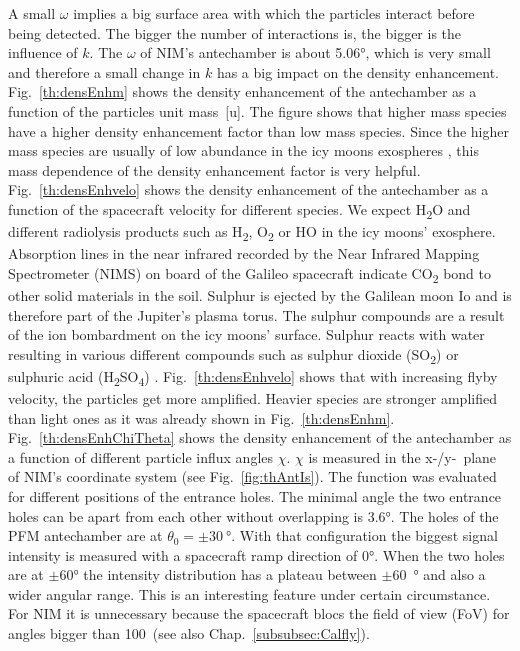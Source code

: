 	A small $\omega$ implies a big surface area with which the particles interact before being detected. The bigger the number of interactions is, the bigger is the influence of $k$. The $\omega$ of NIM's antechamber is about 5.06°, which is very small and therefore a small change in $k$ has a big impact on the density enhancement.\\
	Fig.~\ref{th:densEnhm} shows the density enhancement of the antechamber as a function of the particles unit mass~[u]. The figure shows that higher mass species have a higher density enhancement factor than low mass species. Since the higher mass species are usually of low abundance in the icy moons exospheres \cite{Vorburger2015,Vorburger_2018}, this mass dependence of the density enhancement factor is very helpful.\\
	Fig.~\ref{th:densEnhvelo} shows the density enhancement of the antechamber as a function of the spacecraft velocity for different species. We expect H\textsubscript{2}O and different radiolysis products such as H\textsubscript{2}, O\textsubscript{2} or HO in the icy moons' exosphere. Absorption lines in the near infrared recorded by the Near Infrared Mapping Spectrometer (NIMS) on board of the Galileo spacecraft indicate CO\textsubscript{2} bond to other solid materials in the soil. Sulphur is ejected by the Galilean moon Io and is therefore part of the Jupiter's plasma torus. The sulphur compounds are a result of the ion bombardment on the icy moons' surface. Sulphur reacts with water resulting in various different compounds such as sulphur dioxide (SO\textsubscript{2}) or sulphuric acid (H\textsubscript{2}SO\textsubscript{4}) \cite{Collins_2014}. Fig.~\ref{th:densEnhvelo} shows that with increasing flyby velocity, the particles get more amplified. Heavier species are stronger amplified than light ones as it was already shown in Fig.~\ref{th:densEnhm}.\\
	Fig.~\ref{th:densEnhChiTheta} shows the density enhancement of the antechamber as a function of different particle influx angles $\chi$. $\chi$ is measured in the x-/y-~plane of NIM's coordinate system (see Fig.~\ref{fig:thAntIs}). The function was evaluated for different positions of the entrance holes. The minimal angle the two entrance holes can be apart from each other without overlapping is 3.6\si{\degree}. The holes of the PFM antechamber are at $\theta_0 = \pm30~\si{\degree}$. With that configuration the biggest signal intensity is measured with a spacecraft ramp direction of 0\si{\degree}. When the two holes are at $\pm$60\si{\degree} the intensity distribution has a plateau between $\pm$60~\si{\degree} and also a wider angular range. This is an interesting feature under certain circumstance. For NIM it is unnecessary because the spacecraft blocs the field of view (FoV) for angles bigger than 100\degree~(see also Chap.~\ref{subsubsec:Calfly}).
	
